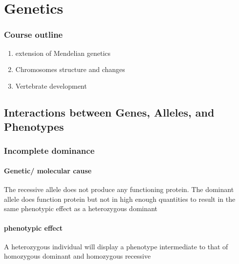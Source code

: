 \documentclass[]{article}
\date{}
\providecommand{\tightlist}{%
  \setlength{\itemsep}{0pt}\setlength{\parskip}{0pt}}
\let\oldparagraph\paragraph
\renewcommand{\paragraph}[1]{\oldparagraph{#1}\mbox{}}
\begin{document}
\hypertarget{genetics}{%
\section{Genetics}\label{genetics}}

\hypertarget{course-outline}{%
\subsubsection{Course outline}\label{course-outline}}

\begin{enumerate}
\def\labelenumi{\arabic{enumi})}
\tightlist
\item
  extension of Mendelian genetics
\item
  Chromosomes structure and changes
\item
  Vertebrate development
\end{enumerate}

\hypertarget{interactions-between-genes-alleles-and-phenotypes}{%
\subsection{Interactions between Genes, Alleles, and
Phenotypes}\label{interactions-between-genes-alleles-and-phenotypes}}

\hypertarget{incomplete-dominance}{%
\subsubsection{Incomplete dominance}\label{incomplete-dominance}}

\hypertarget{genetic-molecular-cause}{%
\paragraph{Genetic/ molecular cause}\label{genetic-molecular-cause}}

The recessive allele does not produce any functioning protein. The
dominant allele does function protein but not in high enough quantities
to result in the same phenotypic effect as a heterozygous dominant

\hypertarget{phenotypic-effect}{%
\paragraph{phenotypic effect}\label{phenotypic-effect}}

A heterozygous individual will display a phenotype intermediate to that
of homozygous dominant and homozygous recessive
\end{document}
